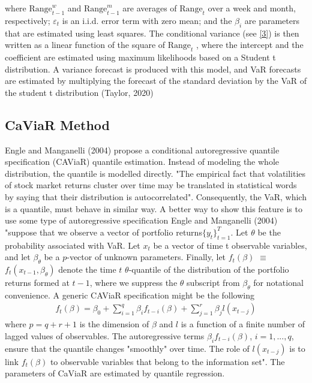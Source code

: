 \documentclass[a4paper,11pt,oneside]{book}
\begin{document}
where  $\text{Range}^{w}_{t-1}$
and $\text{Range}^{m}_{t-1}$ are
averages of $\text{Range}_{t}$ over a week and month, respectively;
$\varepsilon_t$
is an i.i.d. error term with zero mean; and the $\beta_{i}$
are parameters that are estimated using least squares.
The conditional variance (see \autoref{3})  is then written as a linear
function of the square of $\text{Range}_{t}$
, where the intercept and
the coefficient are estimated using maximum likelihoods
based on a Student t distribution. A variance forecast is produced with this model, and VaR forecasts are estimated by multiplying the forecast of the standard deviation by the VaR of the student t distribution (Taylor, 2020)


\subsection{CaViaR Method}
Engle and Manganelli (2004) propose a conditional autoregressive quantile specification (CAViaR) quantile estimation. Instead of modeling the whole distribution, the quantile is modelled directly. "The empirical fact that volatilities of stock market returns cluster over time may be translated in statistical words by saying that their distribution is autocorrelated". Consequently, the VaR, which is a quantile, must behave in similar way. A better way to show this feature is to use some type of autoregressive specification
\newline\newline
Engle and Manganelli (2004) "suppose that we observe a vector of portfolio returns$\{y_t\}^T_{t=1}$. Let $\theta$ be the probability associated with VaR. Let $x_t$ be a vector of time t observable variables, and let  ${\beta}_\theta$ be a $p$-vector of unknown parameters. Finally, let $f_t(\beta) $ $\equiv$ $ f_t(x_{t-1},{\beta}_\theta)$ denote the time $t$ $\theta$-quantile of the distribution of the portfolio returns formed at $t-1$, where we suppress the $\theta$ subscript from $\beta_\theta$ for notational convenience. A generic CAViaR specification might be the following  
\begin{equation}
\begin{aligned}
f_t(\beta)=\beta_0 + \sum_{i=1}^{q} \beta_{i}f _{t-i}(\beta) +\sum_{j=1}^{r}\beta_{j}l(x_{t-j})
\label{5}
\end{aligned}
\end{equation}
where $p=q+r+1$ is the dimension of $\beta$ and $l$ is a function of a finite number of lagged values of observables. The autoregressive terms $\beta_{i}f_{t-i}(\beta)$, $i = 1,...,q$, ensure that the quantile changes "smoothly" over time. The role of $l(x_{t-j})$ is to link $f_{t}(\beta)$ to observable variables that belong to the information set". The parameters of CaViaR are estimated by quantile regression.
\end{document}
